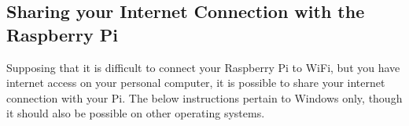 \documentclass{article}
\begin{document}
\begin{enumerate}
		\end{enumerate}
		
		\subsection{Sharing your Internet Connection with the Raspberry Pi}
		Supposing that it is difficult to connect your Raspberry Pi to WiFi, but you have internet access on your personal computer, it is possible to share your internet connection with your Pi. The below instructions pertain to Windows only, though it should also be possible on other operating systems.
		
\end{document}
